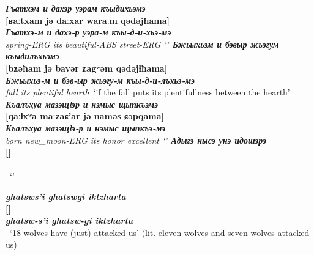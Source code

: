 \documentclass[a4paper,12pt]{book}
\newcommand{\1}[1]{\textbf{\emph{#1}}} %
\newcommand{\2}[1]{\textbf{[#1]}} %
\newcommand{\3}[1]{\fontsize{11pt}{0cm}\textbf{\emph{#1}}} %
\newcommand{\4}[1]{\fontsize{10pt}{0cm}\emph{#1}}	%
\newcommand{\5}[1]{\textbf{/#1/}} %
\newcommand{\6}[1]{\textbf{[#1]}} %
\newcommand{\7}[1]{\fontsize{12pt}{0cm}\emph{#1}} %
\newcommand{\8}[1]{\fontsize{12pt}{0cm}`#1'} %
\newcommand{\9}[1]{\fontsize{12pt}{0cm}(lit. `#1')} %
\begin{document}
\begin{exe}
\ex
\1{Гъатхэм и дахэр уэрам къыдихьэмэ}\\
\2{ʁaːtxam jə daːxar waraːm qədəjħama}\\
\3{Гъатхэ-м и дахэ-р уэра-м къы-д-и-хьэ-мэ}\\
\4{spring-ERG its beautiful-ABS street-ERG}\
\trans \8{}
\ex
\1{Бжьыхьэм и бэвыр жьэгум къыдилъхьэмэ}\\
\2{bʑəħam jə bavər ʑagʷəm qədəjɬħama}\\
\3{Бжьыхьэ-м и бэв-ыр жьэгу-м къы-д-и-лъхьэ-мэ}\\
\4{fall its plentiful hearth}\
\trans \8{if the fall puts its plentifullness between the hearth}
\ex
\1{Къалъхуа мазэщlэр и нэмыс щыпкъэмэ}\\
\2{qaːɬxʷa maːzaɕʼar jə naməs ɕəpqama}\\
\3{Къалъхуа мазэщlэ-р и нэмыс щыпкъэ-мэ}\\
\4{born new_moon-ERG its honor excellent}\
\trans \8{}
\ex
\1{Адыгэ нысэ унэ идошэрэ}\\
\2{}\\
\3{}\\
\4{}\
\trans \8{}

\end{exe}




\begin{exe}
\ex
\1{ghatsws'i ghatswgi iktzharta}\\
\2{}\\
\3{ghatsw-s'i ghatsw-gi iktzharta}\\
\4{}\
\trans \8{18 wolves have (just) attacked us} (lit. eleven wolves and seven wolves attacked us)
\end{exe}
\end{document}

